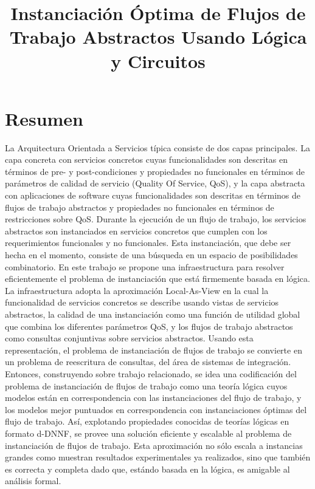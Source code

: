 \documentclass{article}
\begin{document}
\title{Instanciación Óptima de Flujos de Trabajo Abstractos Usando Lógica y Circuitos}
\maketitle

\section{Resumen}

La Arquitectura Orientada a Servicios típica consiste de dos capas principales.
La capa concreta con servicios concretos cuyas funcionalidades son descritas en
términos de pre- y post-condiciones y propiedades no funcionales en términos de
parámetros de calidad de servicio (Quality Of Service, QoS), y la capa abstracta
con aplicaciones de software cuyas funcionalidades son descritas en términos de
flujos de trabajo abstractos y propiedades no funcionales en términos de
restricciones sobre QoS. Durante la ejecución de un flujo de trabajo, los
servicios abstractos son instanciados en servicios concretos que cumplen con los
requerimientos funcionales y no funcionales. Esta instanciación, que debe ser
hecha en el momento, consiste de una búsqueda en un espacio de posibilidades
combinatorio. En este trabajo se propone una infraestructura para resolver
eficientemente el problema de instanciación que está firmemente basada en
lógica. La infraestructura adopta la aproximación Local-As-View en la cual la
funcionalidad de servicios concretos se describe usando vistas de servicios
abstractos, la calidad de una instanciación como una función de utilidad global
que combina los diferentes parámetros QoS, y los flujos de trabajo abstractos
como consultas conjuntivas sobre servicios abstractos. Usando esta
representación, el problema de instanciación de flujos de trabajo se convierte
en un problema de reescritura de consultas, del área de sistemas de integración.
Entonces, construyendo sobre trabajo relacionado, se idea una codificación del
problema de instanciación de flujos de trabajo como una teoría lógica cuyos
modelos están en correspondencia con las instanciaciones del flujo de trabajo, y
los modelos mejor puntuados en correspondencia con instanciaciones óptimas del
flujo de trabajo. Así, explotando propiedades conocidas de teorías lógicas en
formato d-DNNF, se provee una solución eficiente y escalable al problema de
instanciación de flujos de trabajo. Esta aproximación no sólo escala a
instancias grandes como muestran resultados experimentales ya realizados, sino
que también es correcta y completa dado que, estándo basada en la lógica, es
amigable al análisis formal.
\end{document}
